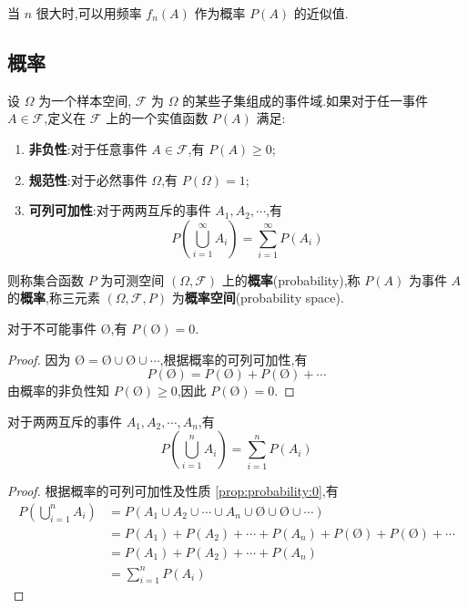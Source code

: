 当 $n$ 很大时,可以用频率 $f_n(A)$ 作为概率 $P(A)$ 的近似值.

\subsection{概率}

\begin{definition}
    \indent 设 $\varOmega$ 为一个样本空间, $\mathcal{F}$ 为 $\varOmega$ 的某些子集组成的事件域.如果对于任一事件 $A \in \mathcal{F}$,定义在 $\mathcal{F}$ 上的一个实值函数 $P(A)$ 满足:
    \begin{enumerate}
        \item \textbf{非负性}:对于任意事件 $A \in \mathcal{F}$,有 $P(A) \geqslant 0$;
        \item \textbf{规范性}:对于必然事件 $\varOmega$,有 $P(\varOmega)=1$;
        \item \textbf{可列可加性}:对于两两互斥的事件 $A_1,A_2,\cdots$,有
        $$
        P \left(\bigcup_{i=1}^\infty A_i \right) = \sum_{i=1}^\infty P(A_i)
        $$
    \end{enumerate}
    则称集合函数 $P$ 为可测空间 $(\varOmega, \mathcal{F})$ 上的\textbf{概率}(probability),称 $P(A)$ 为事件 $A$ 的\textbf{概率},称三元素 $(\varOmega, \mathcal{F}, P)$ 为\textbf{概率空间}(probability space).
\end{definition}

\begin{property}
    \indent 对于不可能事件 $\text{\O}$,有 $P(\text{\O})=0$.
\end{property}

\begin{proof}
    因为 $\text{\O} = \text{\O} \cup \text{\O} \cup \cdots$,根据概率的可列可加性,有
    $$
    P(\text{\O}) = P(\text{\O}) + P(\text{\O}) + \cdots
    $$
    由概率的非负性知 $P(\text{\O}) \geqslant 0$,因此 $P(\text{\O})=0$.
\end{proof}

\begin{property}
    \indent 对于两两互斥的事件 $A_1,A_2,\cdots,A_n$,有
    \begin{equation}
        P \left(\bigcup_{i=1}^n A_i \right) = \sum_{i=1}^n P(A_i)
    \end{equation}
\end{property}

\begin{proof}
    根据概率的可列可加性及性质 \ref{prop:probability:0},有
    $$
    \begin{aligned}
        P \left(\bigcup_{i=1}^n A_i \right) &= P(A_1 \cup A_2 \cup \cdots \cup A_n \cup \text{\O} \cup \text{\O} \cup \cdots) \\
        &= P(A_1) + P(A_2) + \cdots + P(A_n) + P(\text{\O}) + P(\text{\O}) + \cdots \\
        &= P(A_1) + P(A_2) + \cdots + P(A_n) \\
        &= \sum_{i=1}^n P(A_i)
    \end{aligned}
    $$
\end{proof}

